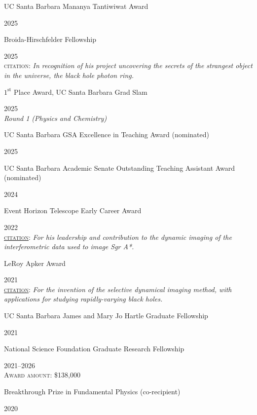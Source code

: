 \documentclass[margin,line]{res}
\newlength{\awarddatewd}
\newlength{\awardtmp}
\newcommand{\award}[3][black]{%
  \settowidth{\awarddatewd}{\quad 2018, 2019}%
  \settowidth{\awardtmp}{\quad 2017--2021}%
  \ifdim\awardtmp>\awarddatewd \setlength{\awarddatewd}{\awardtmp}\fi
  \noindent
  \parbox[t]{\dimexpr\linewidth-\leftskip-\awarddatewd\relax}%
    {\raggedright\leavevmode\color{#1}#2\strut}%
  \hfill{\color{#1}#3}}
\begin{document}
\begin{resume}
\vspace*{-2mm}
\award{UC Santa Barbara Mananya Tantiwiwat Award}{2025}
 
\vspace*{-2mm}
\award{Broida-Hirschfelder Fellowship}{2025} \\
{\color{gray}\textsc{citation}: \textit{In recognition of his project uncovering the secrets of the strangest object in the universe, the black hole photon ring.}}
 
\vspace*{-2mm}
\award{$1^\textrm{st}$ Place Award, UC Santa Barbara Grad Slam}{2025} \\
{\color{gray}\textit{Round 1 (Physics and Chemistry)}}
 
\vspace*{-2mm}
\award{UC Santa Barbara GSA Excellence in Teaching Award (nominated)}{2025}
 
\vspace*{-2mm}
\award{UC Santa Barbara Academic Senate Outstanding Teaching Assistant Award (nominated)}{2024}
 
\vspace*{-2mm}
\award{Event Horizon Telescope Early Career Award}{2022} \\
{\color{gray}\href{https://twitter.com/ehtelescope/status/1602826998346551296}{\textsc{citation}}: \textit{For his leadership and contribution to the dynamic imaging of the interferometric data used to image Sgr A*.}}
 
\vspace*{-2mm}
\award[Maroon]{LeRoy Apker Award}{2021} \\
{\color{gray}\href{https://www.aps.org/funding-recognition/award/leroy-apker-award}{\textsc{citation}}: \textit{For the invention of the selective dynamical imaging method, with applications for studying rapidly-varying black holes.}}
 
\vspace*{-2mm}
\award{UC Santa Barbara James and Mary Jo Hartle Graduate Fellowship}{2021}
 
\vspace*{-2mm}
\award[Maroon]{National Science Foundation Graduate Research Fellowship}{2021--2026} \\
{\color{gray}\textsc{Award amount}: \$138,000}
 
\vspace*{-2mm}
\award[Maroon]{Breakthrough Prize in Fundamental Physics (co-recipient)}{2020}
 

\end{resume}
\end{document}
